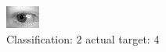 \begin{figure}[h!]
\begin{center}
\includegraphics[width=0.60\columnwidth]{figures/ID724_class_2_target_4.png}
\end{center}
\caption{ Classification: 2 actual target: 4}
\label{fig:ID724_class_2_target_4}
\end{figure}
